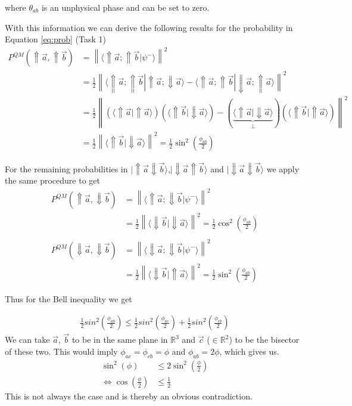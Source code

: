 \documentclass[a4paper]{article}
\begin{document}
where $\theta_{ab}$ is an unphysical phase and can be set to zero.

With this information we can derive the following results for the
probability in Equation \ref{eq:prob} (Task 1)
\begin{align}
    P^{QM}(\Uparrow \vec{a}, \Uparrow \vec{b}) &= \left\|\langle\Uparrow \vec{a}; \Uparrow
    \vec{b}|\psi ^-\rangle \right\|^2 \\
    &=\frac{1}{2} \left\|\langle\Uparrow \vec{a}; \Uparrow \vec{b}|\Uparrow
    \vec{a}; \Downarrow \vec{a}\rangle - \langle \Uparrow \vec{a}; \Uparrow
    \vec{b}| \Downarrow \vec{a}; \Uparrow \vec{a}\rangle\right\|^2 \\
    &= \frac{1}{2}\left\|(\langle\Uparrow \vec{a}|\Uparrow\vec{a}\rangle)
    (\langle\Uparrow \vec{b}| \Downarrow \vec{a}\rangle) - (\underbrace{\langle\Uparrow
    \vec{a}| \Downarrow \vec{a}\rangle}_{\bot})(\langle\Uparrow \vec{b}|
    \Uparrow\vec{a}\rangle)\right\|^2 \\
    &=\frac{1}{2}\left\|\langle\Uparrow\vec{b}|\Downarrow\vec{a}\rangle\right\|^2
    =\frac{1}{2}\sin^2(\frac{\phi_{ab}}{2})
\end{align}

For the remaining probabilities in $|\Uparrow \vec{a}\Downarrow \vec{b}\rangle$,$|\Downarrow
\vec{a}\Uparrow\vec{b}\rangle$ and $|\Downarrow\vec{a}\Downarrow\vec{b} \rangle$
we apply the same procedure to get
\begin{align}
    P^{QM}(\Uparrow \vec{a}, \Downarrow \vec{b}) &= \left\|\langle\Uparrow
    \vec{a}; \Downarrow \vec{b}|\psi^- \rangle\right\|^2 \\
    &=\frac{1}{2}\left\|\langle\Downarrow \vec{b}|\Downarrow
    \vec{a}\rangle\right\|^2 = \frac{1}{2}\cos^2(\frac{\phi_{ab}}{2})\\
    \\
    P^{QM}(\Downarrow \vec{a}, \Downarrow \vec{b}) &= \left\|\langle\Downarrow
    \vec{a}; \Downarrow \vec{b}|\psi^- \rangle\right\|^2 \\
    &=\frac{1}{2}\left\|\langle\Downarrow \vec{b}|\Uparrow
    \vec{a}\rangle\right\|^2 = \frac{1}{2}\sin^2(\frac{\phi_{ab}}{2})
\end{align}

Thus for the Bell inequality we get

\begin{align}
    \frac{1}{2}sin^2(\frac{\phi_{ab}}{2}) \leq
    \frac{1}{2}sin^2(\frac{\phi_{ac}}{2})+
    \frac{1}{2}sin^2(\frac{\phi_{cb}}{2})
\end{align}
We can take $\vec{a}$, $\vec{b}$ to be in the same plane in $\mathbb{R}^3$ and
$\vec{c}$ ($\in \mathbb{R}^2$) to be the bisector of these two. This would imply
$\phi_{ac}=\phi_{cb}= \phi$ and $\phi_{ab}=2\phi$, which gives us.
\begin{align}
    \sin^2(\phi) &\leq 2\sin^2(\frac{\phi}{2})\\
    \Leftrightarrow \cos(\frac{\phi}{2}) &\leq \frac{1}{2}
\end{align}
This is not always the case and is thereby an obvious contradiction.
\end{document}
